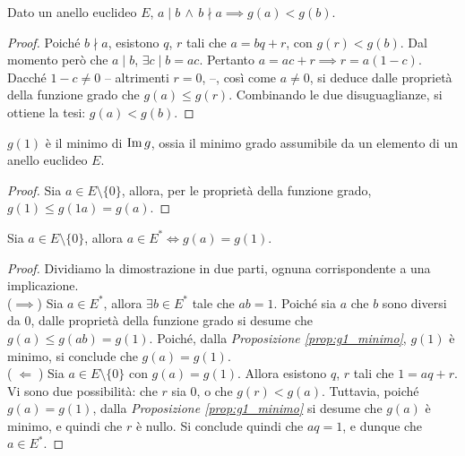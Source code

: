 \documentclass[11pt]{scrbook}
\begin{document}
\begin{proposition}
    Dato un anello euclideo $E$, $a \mid b \,\land\, b \nmid a \implies g(a) < g(b)$.
\end{proposition}

\begin{proof}
    Poiché $b \nmid a$, esistono $q$, $r$ tali che $a = bq + r$, con
    $g(r) < g(b)$. Dal momento però che $a \mid b$, $\exists c \mid
        b = ac$. Pertanto $a = ac + r \implies r = a(1-c)$. Dacché $1-c \neq 0$ --
    altrimenti $r=0$, \Lightning{} --, così come $a \neq 0$, si deduce
    dalle proprietà della funzione grado che $g(a) \leq g(r)$.
    Combinando le due disuguaglianze, si ottiene la
    tesi: $g(a) < g(b)$.
\end{proof}

\begin{proposition}
    \label{prop:g1_minimo}
    $g(1)$ è il minimo di $\operatorname{Im} g$, ossia il minimo grado assumibile
    da un elemento di un anello euclideo $E$.
\end{proposition}

\begin{proof}
    Sia $a \in E \setminus \{0\}$, allora, per le proprietà della funzione
    grado, $g(1) \leq g(1a) = g(a)$.
\end{proof}

\begin{theorem}
    Sia $a \in E \setminus \{0\}$, allora $a \in E^* \iff g(a) = g(1)$.
\end{theorem}

\begin{proof}
    Dividiamo la dimostrazione in due parti, ognuna corrispondente a una implicazione. \\

    ($\implies$) \;Sia $a \in E^*$, allora $\exists b \in E^*$ tale che $ab=1$. Poiché
    sia $a$ che $b$ sono diversi da $0$, dalle proprietà della funzione grado si
    desume che $g(a) \leq g(ab) = g(1)$. Poiché, dalla \textit{Proposizione \ref{prop:g1_minimo}},
    $g(1)$ è minimo, si conclude che $g(a) = g(1)$. \\

    ($\;\Longleftarrow\;$) \;Sia $a \in E \setminus \{0\}$ con $g(a) = g(1)$. Allora
    esistono $q$, $r$ tali che $1 = aq + r$. Vi sono due possibilità: che $r$ sia $0$, o
    che $g(r) < g(a)$. Tuttavia, poiché $g(a)=g(1)$, dalla \textit{Proposizione \ref{prop:g1_minimo}} si desume che $g(a)$ è minimo, e quindi che
    $r$ è nullo. Si conclude quindi che $aq = 1$, e dunque che $a \in E^*$.
\end{proof}
\end{document}
